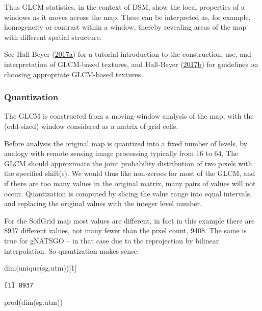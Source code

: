 \documentclass[
  letterpaper,
  DIV=11,
  numbers=noendperiod]{scrartcl}
\newenvironment{Shaded}{\begin{snugshade}}{\end{snugshade}}
\newcommand{\DecValTok}[1]{\textcolor[rgb]{0.68,0.00,0.00}{#1}}
\newcommand{\FunctionTok}[1]{\textcolor[rgb]{0.28,0.35,0.67}{#1}}
\newcommand{\NormalTok}[1]{\textcolor[rgb]{0.00,0.23,0.31}{#1}}
\begin{document}
Thus GLCM statistics, in the context of DSM, show the local properties
of a windows as it moves across the map. These can be interpreted as,
for example, homogeneity or contrast within a window, thereby revealing
areas of the map with different spatial structure.

See Hall-Beyer
(\protect\hyperlink{ref-hall-beyerGLCMTextureTutorial2017}{2017a}) for a
tutorial introduction to the construction, use, and interpretation of
GLCM-based textures, and Hall-Beyer
(\protect\hyperlink{ref-hall-beyerPracticalGuidelinesChoosing2017}{2017b})
for guidelines on choosing appropriate GLCM-based textures.

\hypertarget{sec-glcm-quant}{%
\subsubsection{Quantization}\label{sec-glcm-quant}}

The GLCM is constructed from a moving-window analysis of the map, with
the (odd-sized) window considered as a matrix of grid cells.

Before analysis the original map is quantized into a fixed number of
levels, by analogy with remote sensing image processing typically from
16 to 64. The GLCM should approximate the joint probability distribution
of two pixels with the specified shift(s). We would thus like non-zeroes
for most of the GLCM, and if there are too many values in the original
matrix, many pairs of values will not occur. Quantization is computed by
slicing the value range into equal intervals and replacing the original
values with the integer level number.

For the SoilGrid map most values are different, in fact in this example
there are 8937 different values, not many fewer than the pixel count,
9408. The same is true for gNATSGO -- in that case due to the
reprojection by bilinear interpolation. So quantization makes sense.

\begin{Shaded}
\begin{Highlighting}[]
\FunctionTok{dim}\NormalTok{(}\FunctionTok{unique}\NormalTok{(sg.utm))[}\DecValTok{1}\NormalTok{]}
\end{Highlighting}
\end{Shaded}

\begin{verbatim}
[1] 8937
\end{verbatim}

\begin{Shaded}
\begin{Highlighting}[]
\FunctionTok{prod}\NormalTok{(}\FunctionTok{dim}\NormalTok{(sg.utm))}
\end{Highlighting}
\end{Shaded}
\end{document}
